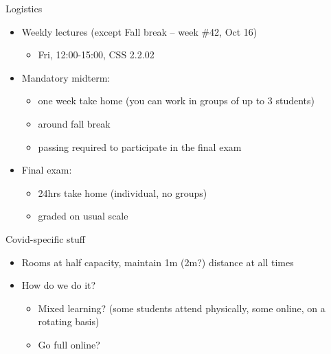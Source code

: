 \documentclass[english,10pt
,aspectratio=169
]{beamer}
\begin{document}
\begin{frame}{Logistics}
\begin{itemize}
	\item Weekly lectures (except Fall break -- week \#42, Oct 16)
	\begin{itemize}
		\item Fri, 12:00-15:00, CSS 2.2.02
	\end{itemize}
	
	\pause
	\item Mandatory midterm:
	\begin{itemize}
		\item one week take home (you can work in groups of up to 3 students)
		\item around fall break
		\item passing required to participate in the final exam
	\end{itemize}
	
	\item Final exam:
	\begin{itemize}
		\item 24hrs take home (individual, no groups)
		\item graded on usual scale
	\end{itemize}
\end{itemize}
\end{frame}


\begin{frame}{Covid-specific stuff}
	\begin{itemize}
		\item Rooms at half capacity, maintain 1m (2m?) distance at all times
		\item How do we do it?
		\begin{itemize}
			\item Mixed learning? (some students attend physically, some online, on a rotating basis)
			\item Go full online?
		\end{itemize}
	\end{itemize}
\end{frame}
\end{document}
